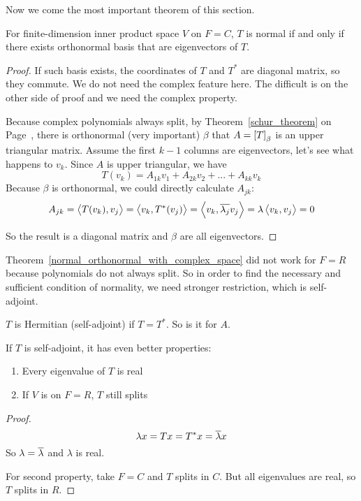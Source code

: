 Now we come the most important theorem of this section.

\begin{theorem}\label{normal_orthonormal_with_complex_space}
    For finite-dimension inner product space $V$ on $F=C$, $T$ is normal if and only if there exists orthonormal basis that are eigenvectors of $T$.
\end{theorem}
\begin{proof}
    If such basis exists, the coordinates of $T$ and $T^*$ are diagonal matrix, so they commute. We do not need the complex feature here. The difficult is on the other side of proof and we need the complex property.
    
    Because complex polynomials always split, by Theorem~\ref{schur_theorem} on Page~\pageref{schur_theorem}, there is orthonormal (very important) $\beta$ that $A=\coordinate{T}_\beta$ is an upper triangular matrix. Assume the first $k-1$ columns are eigenvectors, let's see what happens to $v_{k}$. Since $A$ is upper triangular, we have
    \begin{equation*}
        T(v_k) = A_{1k} v_1 + A_{2k} v_2 + ... + A_{kk} v_k
    \end{equation*}
    Because $\beta$ is orthonormal, we could directly calculate $A_{jk}$:
    \begin{equation*}
        A_{jk} = \left\langle \displaystyle T(v_k), v_j \right\rangle = \left\langle \displaystyle v_k, T^*(v_j) \right\rangle = \left\langle \displaystyle v_k, \overline{\lambda_j} v_j \right\rangle = \lambda \left\langle \displaystyle v_k, v_j \right\rangle = 0
    \end{equation*}
    
    So the result is a diagonal matrix and $\beta$ are all eigenvectors.
\end{proof}

Theorem~\ref{normal_orthonormal_with_complex_space} did not work for $F=R$ because polynomials do not always split. So in order to find the necessary and sufficient condition of normality, we need stronger restriction, which is self-adjoint.

\begin{definition}
    $T$ is Hermitian (self-adjoint) if $T = T^*$. So is it for $A$.
\end{definition}

If $T$ is self-adjoint, it has even better properties:
\begin{enumerate}
    \item Every eigenvalue of $T$ is real
    \item If $V$ is on $F=R$, $T$ still splits
\end{enumerate}
\begin{proof}
    \begin{equation*}
        \lambda x = Tx = T^* x = \overline{\lambda} x
    \end{equation*}
    So $\lambda = \overline{\lambda}$ and $\lambda$ is real.
    
    For second property, take $F=C$ and $T$ splits in $C$. But all eigenvalues are real, so $T$ splits in $R$.
\end{proof}

